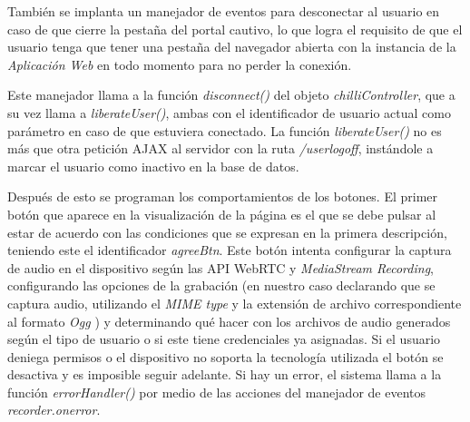También se implanta un manejador de eventos para desconectar al usuario en caso de que cierre la pestaña del portal cautivo, lo que logra el requisito de que el usuario tenga que tener una pestaña del navegador abierta con la instancia de la \emph{Aplicación Web} en todo momento para no perder la conexión.


Este manejador llama a la función \emph{disconnect()} del objeto \emph{chilliController}, que a su vez llama a \emph{liberateUser()}, ambas con el identificador de usuario actual como parámetro en caso de que estuviera conectado. La función \emph{liberateUser()} no es más que otra petición AJAX al servidor con la ruta \emph{/userlogoff}, instándole a marcar el usuario como inactivo en la base de datos.


Después de esto se programan los comportamientos de los botones. El primer botón que aparece en la visualización de la página es el que se debe pulsar al estar de acuerdo con las condiciones que se expresan en la primera descripción, teniendo este el identificador \emph{agreeBtn}. Este botón intenta configurar la captura de audio en el dispositivo según las API WebRTC y \emph{MediaStream Recording}, configurando las opciones de la grabación (en nuestro caso declarando que se captura audio, utilizando el \emph{\acrshort{MIME} type} y la extensión de archivo correspondiente al formato \emph{Ogg} \cite{OggRFC1, OggRFC2}) y determinando qué hacer con los archivos de audio generados según el tipo de usuario o si este tiene credenciales ya asignadas. Si el usuario deniega permisos o el dispositivo no soporta la tecnología utilizada el botón se desactiva y es imposible seguir adelante. Si hay un error, el sistema llama a la función \emph{errorHandler()} por medio de las acciones del manejador de eventos \emph{recorder.onerror}.

